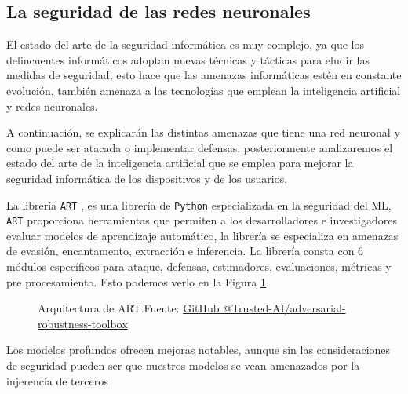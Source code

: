 
\subsection{La seguridad de las redes neuronales} \label{ch:2:section:state-of-the-art:computer-security-in-neural-networks}

El estado del arte de la seguridad informática es muy complejo, ya que los delincuentes informáticos adoptan nuevas técnicas y tácticas para eludir las medidas de seguridad, esto hace que las amenazas informáticas estén en constante evolución, también amenaza a las tecnologías que emplean la inteligencia artificial y redes neuronales.

A continuación, se explicarán las distintas amenazas que tiene una red neuronal y como puede ser atacada o implementar defensas, posteriormente analizaremos el estado del arte de la inteligencia artificial que se emplea para mejorar la seguridad informática de los dispositivos y de los usuarios.

La librería \texttt{ART} \cite{art2018}, es una librería de \texttt{Python} especializada en la seguridad del \gls{ML}, \texttt{ART} proporciona herramientas que permiten a los desarrolladores e investigadores evaluar modelos de aprendizaje automático, la librería se especializa en amenazas de evasión, encantamento, extracción e inferencia. La librería consta con 6 módulos específicos para ataque, defensas, estimadores, evaluaciones, métricas y pre procesamiento. Esto podemos verlo en la Figura \ref{fig:art-architecture}.

\begin{figure}[H]
    \centering
    \centerline{}
    \caption{Arquitectura de ART.\newline{}Fuente: \href{https://github.com/Trusted-AI/adversarial-robustness-toolbox/wiki/ART-Architecture-and-Roadmap}{GitHub @Trusted-AI/adversarial-robustness-toolbox}}
    \label{fig:art-architecture}
\end{figure}

Los modelos profundos ofrecen mejoras notables, aunque sin las consideraciones de seguridad pueden ser que nuestros modelos se vean amenazados por la injerencia de terceros

